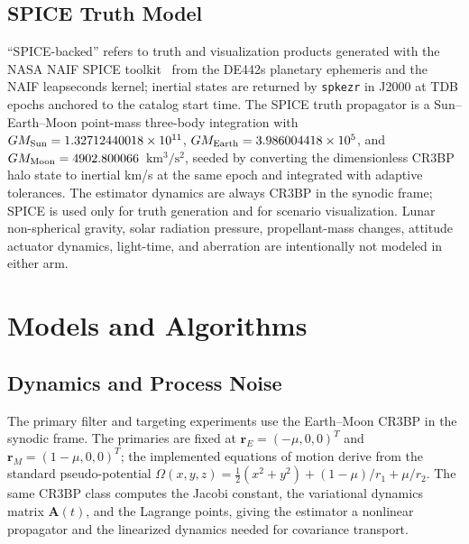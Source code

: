 \documentclass[10pt,twocolumn]{article}
\newcommand{\vect}[1]{\mathbf{#1}}
\newcommand{\mat}[1]{\mathbf{#1}}
\begin{document}
\subsection{SPICE Truth Model}
``SPICE-backed'' refers to truth and visualization products generated with the NASA NAIF SPICE toolkit~\cite{naif} from the DE442s planetary ephemeris and the NAIF leapseconds kernel; inertial states are returned by \texttt{spkezr} in J2000 at TDB epochs anchored to the catalog start time.  The SPICE truth propagator is a Sun--Earth--Moon point-mass three-body integration with $GM_{\rm Sun}=1.32712440018\times 10^{11}$, $GM_{\rm Earth}=3.986004418\times 10^{5}$, and $GM_{\rm Moon}=4902.800066$~$\mathrm{km^3/s^2}$, seeded by converting the dimensionless CR3BP halo state to inertial km/s at the same epoch and integrated with adaptive tolerances.  The estimator dynamics are always CR3BP in the synodic frame; SPICE is used only for truth generation and for scenario visualization.  Lunar non-spherical gravity, solar radiation pressure, propellant-mass changes, attitude actuator dynamics, light-time, and aberration are intentionally not modeled in either arm.

\section{Models and Algorithms}
\label{sec:methods}

\subsection{Dynamics and Process Noise}
The primary filter and targeting experiments use the Earth--Moon CR3BP in the synodic frame.  The primaries are fixed at $\vect{r}_E=(-\mu,0,0)^T$ and $\vect{r}_M=(1-\mu,0,0)^T$; the implemented equations of motion derive from the standard pseudo-potential $\Omega(x,y,z)=\tfrac{1}{2}(x^2+y^2)+(1-\mu)/r_1+\mu/r_2$.  The same CR3BP class computes the Jacobi constant, the variational dynamics matrix $\mat{A}(t)$, and the Lagrange points, giving the estimator a nonlinear propagator and the linearized dynamics needed for covariance transport.
\end{document}
